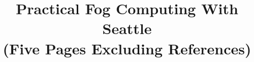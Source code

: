 \documentclass[conference]{IEEEtran}
\begin{document}
\title{Practical Fog Computing With Seattle\\
(Five Pages Excluding References)}


\author{
\and
{}
\and
{}
}

\maketitle







\end{document}
